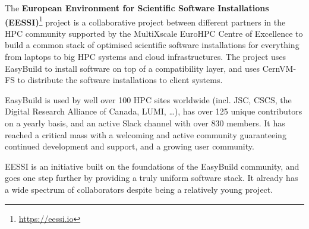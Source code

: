 
The \textbf{European Environment for Scientific Software Installations
(EESSI)}\footnote{\href{https://eessi.io}{https://eessi.io}} project is a collaborative project
between different partners in the HPC community supported by the MultiXscale EuroHPC Centre of Excellence to build a
common stack of optimised scientific software installations for everything from laptops to big HPC systems and cloud
infrastructures. The project uses EasyBuild to install software on top of a compatibility layer, and uses CernVM-FS to
distribute the software installations to client systems.

EasyBuild is used by well over 100 HPC sites worldwide (incl. JSC, CSCS, the Digital Research Alliance of Canada, LUMI,
\ldots),
has over 125 unique contributors on a yearly basis,
and an active Slack channel with over 830 members.
It has reached a critical mass with a welcoming and active community guaranteeing continued development and support, and
a growing user community.

EESSI is an initiative built on the foundations of the EasyBuild community, and goes one step further by providing a
truly uniform software stack. It already has a wide spectrum of collaborators despite being a relatively young project.

